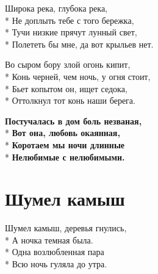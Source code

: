 \medskip

\begin{minipage}{\linewidth}
Широка река, глубока река,\\*
Не доплыть тебе с того бережка,\\*
Тучи низкие прячут лунный свет,\\*
Полететь бы мне, да вот крыльев нет.\\
\end{minipage}\par\medskip\nobreak

\medskip

\begin{minipage}{\linewidth}
Во сыром бору злой огонь кипит,\\*
Конь черней, чем ночь, у огня стоит,\\*
Бьет копытом он, ищет седока,\\*
Оттолкнул тот конь наши берега.\\
\end{minipage}\par\medskip\nobreak

\medskip

\begin{minipage}{\linewidth}
\hspace*{1.5em}\textbf{Постучалась в дом боль незваная,}\\*
\hspace*{1.5em}\textbf{Вот она, любовь окаянная,}\\*
\hspace*{1.5em}\textbf{Коротаем мы ночи длинные}\\*
\hspace*{1.5em}\textbf{Нелюбимые с нелюбимыми.}\\
\end{minipage}

\vspace{\fill}\newpage

\section{Шумел камыш}
\label{song:Шумел_камыш}

\medskip

\begin{minipage}{\linewidth}
Шумел камыш, деревья гнулись,\\*
А ночка темная была.\\*
Одна возлюбленная пара\\*
Всю ночь гуляла до утра.\\
\end{minipage}\par\medskip\nobreak


